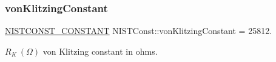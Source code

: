 \subsubsection{\texorpdfstring{von\+Klitzing\+Constant}{vonKlitzingConstant}}
{\footnotesize\ttfamily \mbox{\hyperlink{group___n_i_s_t_const-_macros_ga2b0fc1d7452373f816175dd86ce26729}{N\+I\+S\+T\+C\+O\+N\+S\+T\+\_\+\+C\+O\+N\+S\+T\+A\+NT}} N\+I\+S\+T\+Const\+::von\+Klitzing\+Constant = 25812.}

$R_K \ (\Omega)$ von Klitzing constant in ohms. 